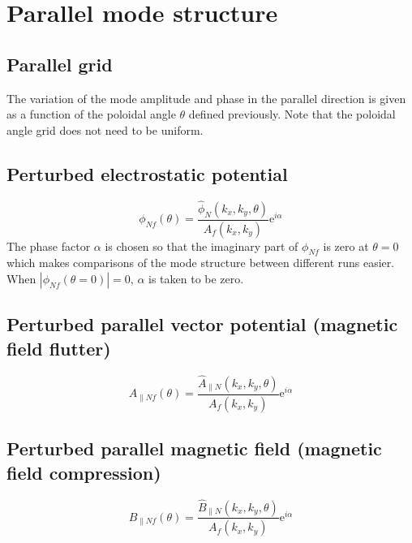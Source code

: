 \documentclass[a4paper]{report}
\begin{document}
\section{Parallel mode structure}
\subsection{Parallel grid} \label{sec:polgrid}
The variation of the mode amplitude and phase in the parallel direction is given as a function of the poloidal angle $\theta$ defined previously. Note that the poloidal angle grid does not need to be uniform.
\subsection{Perturbed electrostatic potential} \label{sec:eigenmode:phi}
$$\phi_{Nf}(\theta) = \frac{\hat{\phi}_N(k_x,k_y,\theta)}{A_f(k_x,k_y)}\textrm{e}^{i\alpha}$$
The phase factor $\alpha$ is chosen so that the imaginary part of $\phi_{Nf}$ is zero at $\theta=0$ which makes comparisons of the mode structure between different runs easier.
When $|\phi_{Nf}(\theta=0)|=0$, $\alpha$ is taken to be zero.
 
\subsection{Perturbed parallel vector potential (magnetic field flutter)} \label{sec:eigenmode:apar}
$$A_{\parallel Nf}(\theta) = \frac{\hat{A}_{\parallel N}(k_x,k_y,\theta)}{A_f(k_x,k_y)}\textrm{e}^{i\alpha}$$
\subsection{Perturbed parallel magnetic field (magnetic field compression)} \label{sec:eigenmode:bpar}
$$B_{\parallel Nf}(\theta) = \frac{\hat{B}_{\parallel N}(k_x,k_y,\theta)}{A_f(k_x,k_y)}\textrm{e}^{i\alpha}$$
\end{document}
